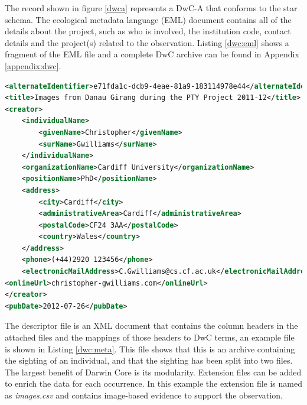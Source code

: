 The record shown in figure \ref{dwca} represents a DwC-A that conforms to the star schema. The ecological metadata language (EML) document contains all of the details about the project, such as who is involved, the institution code, contact details and the project(s) related to the observation. Listing \ref{dwc:eml} shows a fragment of the EML file and a complete DwC archive can be found in Appendix \ref{appendix:dwc}.
\vspace{\baselineskip}
% 
\begin{lstlisting}[caption=Darwin Core Ecological Metadata File Fragment, label=dwc:eml, breaklines=true, language=XML]
<alternateIdentifier>e71fda1c-dcb9-4eae-81a9-183114978e44</alternateIdentifier>
<title>Images from Danau Girang during the PTY Project 2011-12</title>
<creator>
	<individualName>
		<givenName>Christopher</givenName>
		<surName>Gwilliams</surName>
	</individualName>
	<organizationName>Cardiff University</organizationName>
	<positionName>PhD</positionName>
	<address>
		<city>Cardiff</city>
		<administrativeArea>Cardiff</administrativeArea>
		<postalCode>CF24 3AA</postalCode>
		<country>Wales</country>
	</address>
	<phone>(+44)2920 123456</phone>
	<electronicMailAddress>C.Gwilliams@cs.cf.ac.uk</electronicMailAddress>
<onlineUrl>christopher-gwilliams.com</onlineUrl>
</creator>
<pubDate>2012-07-26</pubDate>
 \end{lstlisting}

The descriptor file is an XML document that contains the column headers in the attached files and the mappings of those headers to DwC terms, an example file is shown in Listing \ref{dwc:meta}. This file shows that this is an archive containing the sighting of an individual, and that the sighting has been split into two files. The largest benefit of Darwin Core is its modularity. Extension files can be added to enrich the data for each occurrence. In this example the extension file is named as \textit{images.csv} and contains image-based evidence to support the observation.

\noindent\begin{minipage}{\textwidth}

\end{minipage}

